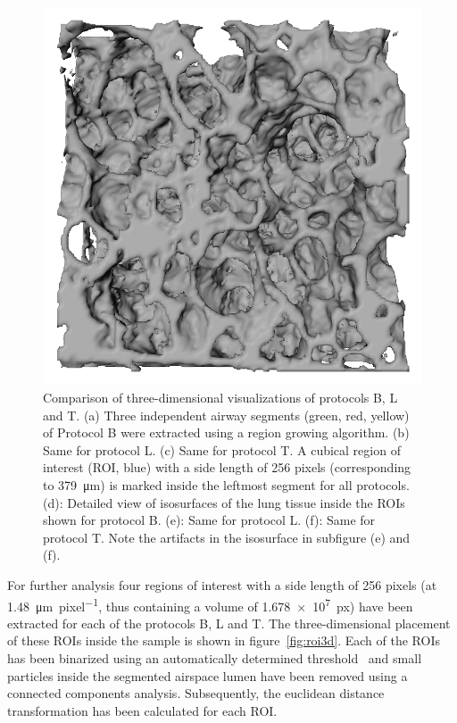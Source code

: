 \begin{figure}[htp]
		\includegraphics[width=\imagewidth]{img/comparisonBvsT/roiT}%
		\caption{%
			Comparison of three-dimensional visualizations of protocols B, L and T. %
			(a) Three independent airway segments (green, red, yellow) of Protocol B were extracted using a region growing algorithm. %
			(b) Same for protocol L. %
			(c) Same for protocol T. A cubical region of interest (ROI, blue) with a side length of 256 pixels (corresponding to \SI{379}{\micro\meter}) is marked inside the leftmost segment for all protocols. %
			(d): Detailed view of isosurfaces of the lung tissue inside the ROIs shown for protocol B. %
			(e): Same for protocol L.
			(f): Same for protocol T. Note the artifacts in the isosurface in subfigure (e) and (f).%
			}%
		\label{fig:BvsT}%
	\end{figure}
\fi%

For further analysis four regions of interest with a side length of 256 pixels (at \SI{1.48}{\micro\meter\per pixel}, thus containing a volume of \SI{1.678e7}{px}) have been extracted for each of the protocols B, L and T. The three-dimensional placement of these ROIs inside the sample is shown in figure~\ref{fig:roi3d}. Each of the ROIs has been binarized using an automatically determined threshold~\cite{Otsu1979} and small particles inside the segmented airspace lumen have been removed using a connected components analysis. Subsequently, the euclidean distance transformation has been calculated for each ROI.

